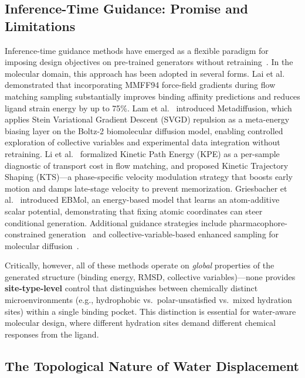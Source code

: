 \documentclass[11pt,letterpaper]{article}
\begin{document}
\subsection{Inference-Time Guidance: Promise and Limitations}

Inference-time guidance methods have emerged as a flexible paradigm for imposing
design objectives on pre-trained generators without
retraining~\cite{dhariwal2021,ho2022cfg,bansal2023}.  In the molecular domain,
this approach has been adopted in several forms.  Lai et al.~\cite{lai2025force}
demonstrated that incorporating MMFF94 force-field gradients during flow
matching sampling substantially improves binding affinity predictions and
reduces ligand strain energy by up to 75\%.  Lam et al.~\cite{lam2026metadiffusion}
introduced Metadiffusion, which applies Stein Variational Gradient Descent
(SVGD) repulsion as a meta-energy biasing layer on the Boltz-2 biomolecular
diffusion model, enabling controlled exploration of collective variables and
experimental data integration without retraining.  Li et al.~\cite{li2026kpe}
formalized Kinetic Path Energy (KPE) as a per-sample diagnostic of transport
cost in flow matching, and proposed Kinetic Trajectory Shaping (KTS)---a
phase-specific velocity modulation strategy that boosts early motion and damps
late-stage velocity to prevent memorization.  Griesbacher et
al.~\cite{griesbacher2026ebmol} introduced EBMol, an energy-based model that
learns an atom-additive scalar potential, demonstrating that fixing atomic
coordinates can steer conditional generation.  Additional guidance strategies
include pharmacophore-constrained generation~\cite{kpe2024} and
collective-variable-based enhanced sampling for molecular diffusion~\cite{nam2025cv}.

Critically, however, all of these methods operate on \emph{global} properties of
the generated structure (binding energy, RMSD, collective variables)---none
provides \textbf{site-type-level} control that distinguishes between chemically
distinct microenvironments (e.g., hydrophobic vs.\ polar-unsatisfied vs.\ mixed
hydration sites) within a single binding pocket.  This distinction is essential
for water-aware molecular design, where different hydration sites demand
different chemical responses from the ligand.

\subsection{The Topological Nature of Water Displacement}
\end{document}
